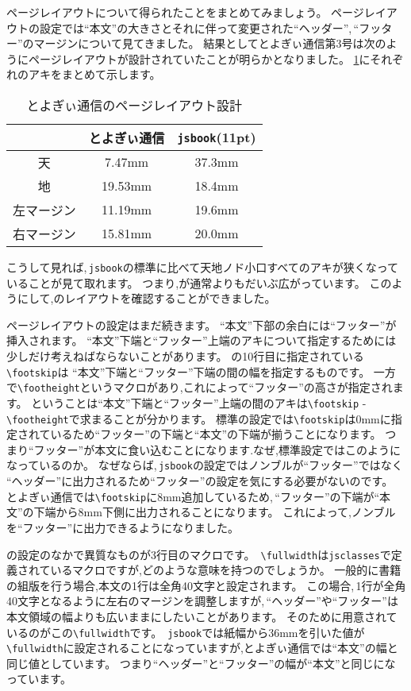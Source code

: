 ページレイアウトについて得られたことをまとめてみましょう。
ページレイアウトの設定では``本文''の大きさとそれに伴って変更された``ヘッダー'',\,``フッター''のマージンについて見てきました。
結果としてとよぎぃ通信第3号は次のようにページレイアウトが設計されていたことが明らかとなりました。
\tablename\ref{tbl:toyogylayout}にそれぞれのアキをまとめて示します。

\begin{table}[!ht]
	\centering
	\caption{とよぎぃ通信のページレイアウト設計}
	\label{tbl:toyogylayout}
	\begin{tabular}{c|c|c} \hline \hline
		& とよぎぃ通信 & \verb|jsbook|(11pt) \\ \hline
		天 & 7.47mm & 37.3mm \\
		地 & 19.53mm & 18.4mm \\
		左マージン & 11.19mm & 19.6mm \\
		右マージン & 15.81mm & 20.0mm \\ \hline
	\end{tabular}
\end{table}

こうして見れば,\,\verb|jsbook|の標準に比べて天地ノド小口すべてのアキが狭くなっていることが見て取れます。
つまり,が通常よりもだいぶ広がっています。
このようにして,のレイアウトを確認することができました。

ページレイアウトの設定はまだ続きます。
``本文''下部の余白には``フッター''が挿入されます。
``本文''下端と``フッター''上端のアキについて指定するためには少しだけ考えねばならないことがあります。
の10行目に指定されている\verb|\footskip|は
``本文''下端と``フッター''下端の間の幅を指定するものです。
一方で\verb|\footheight|というマクロがあり,これによって``フッター''の高さが指定されます。
ということは``本文''下端と``フッター''上端の間のアキは\verb|\footskip| - \verb|\footheight|で求まることが分かります。
標準の設定では\verb|\footskip|は0mmに指定されているため``フッター''の下端と``本文''の下端が揃うことになります。
つまり``フッター''が本文に食い込むことになります.なぜ,標準設定ではこのようになっているのか。
なぜならば,\,\verb|jsbook|の設定ではノンブルが``フッター''ではなく
``ヘッダー''に出力されるため``フッター''の設定を気にする必要がないのです。
とよぎぃ通信では\verb|\footskip|に8mm追加しているため,\,``フッター''の下端が``本文''の下端から8mm下側に出力されることになります。
これによって,ノンブルを``フッター''に出力できるようになりました。

の設定のなかで異質なものが3行目のマクロです。
\,\verb|\fullwidth|は\verb|jsclasses|で定義されているマクロですが,どのような意味を持つのでしょうか。
一般的に書籍の組版を行う場合,本文の1行は全角40文字と設定されます。
この場合,\,1行が全角40文字となるように左右のマージンを調整しますが,\,``ヘッダー''や``フッター''は本文領域の幅よりも広いままにしたいことがあります。
そのために用意されているのがこの\verb|\fullwidth|です。\,
\verb|jsbook|では紙幅から36mmを引いた値が\,\verb|\fullwidth|に設定されることになっていますが,とよぎぃ通信では``本文''の幅と同じ値としています。
つまり``ヘッダー''と``フッター''の幅が``本文''と同じになっています。

